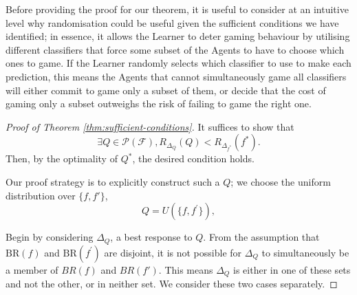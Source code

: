 Before providing the proof for our theorem, it is useful to consider at an intuitive level why randomisation could be useful given the sufficient conditions we have identified; in essence, it allows the Learner to deter gaming behaviour by utilising different classifiers that force some subset of the Agents to have to choose which ones to game. If the Learner randomly selects which classifier to use to make each prediction, this means the Agents that cannot simultaneously game all classifiers will either commit to game only a subset of them, or decide that the cost of gaming only a subset outweighs the risk of failing to game the right one.

\begin{proof}[Proof of Theorem \ref{thm:sufficient-conditions}]
    It suffices to show that
    \begin{equation}
        \exists Q \in \mathcal{P}(\mathcal{F}), R_{\Delta_{Q}}(Q) < R_{\Delta_{f^{\ast}}}(f^{\ast}).
    \end{equation}
    Then, by the optimality of $Q^{\ast}$, the desired condition holds.
    
    Our proof strategy is to explicitly construct such a $Q$; we choose the uniform distribution over $\{f, f'\}$,
    \begin{equation}
        Q = U(\{f, f^\prime\}),
    \end{equation}
    
    Begin by considering $\Delta_{Q}$, a best response to $Q$. From the assumption that $\text{BR}(f)$ and $\text{BR}(f^\prime)$ are disjoint, it is not possible for $\Delta_{Q}$ to simultaneously be a member of $BR(f)$ and $BR(f')$. This means $\Delta_{Q}$ is either in one of these sets and not the other, or in neither set. We consider these two cases separately.
    

\end{proof}
